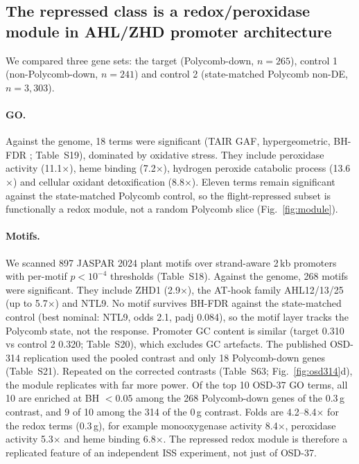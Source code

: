 \documentclass[11pt,a4paper]{article}
\newcommand{\Sx}[1]{Table~S#1}
\begin{document}
\subsection{The repressed class is a redox/peroxidase module in AHL/ZHD promoter architecture}

We compared three gene sets: the target (Polycomb-down, $n=265$), control 1 (non-Polycomb-down,
$n=241$) and control 2 (state-matched Polycomb non-DE, $n=3{,}303$).

\paragraph{GO.} Against the genome, 18 terms were significant (TAIR GAF, hypergeometric,
BH-FDR \citep{go2023knowledgebase}; \Sx{19}), dominated by oxidative stress. They include peroxidase activity
(11.1$\times$), heme binding (7.2$\times$), hydrogen peroxide catabolic process
(13.6$\times$) and cellular oxidant detoxification (8.8$\times$). Eleven terms
remain significant against the state-matched Polycomb control, so the flight-repressed
subset is functionally a redox module, not a random Polycomb slice
(Fig.~\ref{fig:module}).

\paragraph{Motifs.} We scanned 897 JASPAR 2024 plant motifs \citep{rauluseviciute2024jaspar} over strand-aware 2\,kb promoters
with per-motif $p<10^{-4}$ thresholds (\Sx{18}). Against the genome, 268 motifs were significant.
They include ZHD1 (2.9$\times$), the AT-hook family AHL12/13/25 (up to 5.7$\times$) and NTL9.
No motif survives BH-FDR against the state-matched control (best nominal: NTL9, odds 2.1, padj
0.084), so the motif layer tracks the Polycomb state, not the response. Promoter GC
content is similar (target 0.310 vs control 2 0.320; \Sx{20}), which excludes GC artefacts.
The published OSD-314 replication used the pooled contrast and only 18 Polycomb-down genes (\Sx{21}).
Repeated on the corrected contrasts (\Sx{63}; Fig.~\ref{fig:osd314}d), the module replicates with far more power.
Of the top 10 OSD-37 GO terms, all 10 are enriched at BH $<0.05$ among the 268 Polycomb-down genes of the 0.3\,g contrast,
and 9 of 10 among the 314 of the 0\,g contrast. Folds are 4.2--8.4$\times$ for the redox terms (0.3\,g), for example
monooxygenase activity 8.4$\times$, peroxidase activity 5.3$\times$ and heme binding 6.8$\times$. The repressed redox
module is therefore a replicated feature of an independent ISS experiment, not just of OSD-37.
\end{document}
